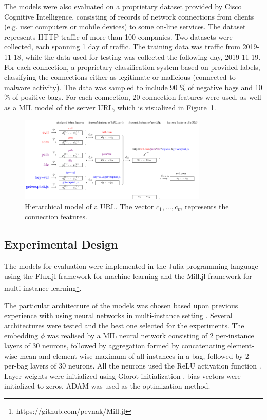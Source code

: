 The models were also evaluated on a proprietary dataset provided by Cisco Cognitive Intelligence, consisting of records of network connections from clients (e.g. user computers or mobile devices) to some on-line services. The dataset represents HTTP traffic of more than 100 companies. Two datasets were collected, each spanning 1 day of traffic. The training data was traffic from 2019-11-18, while the data used for testing was collected the following day, 2019-11-19. For each connection, a proprietary classification system based on \cite{jusko_graph-based_2017} provided labels, classifying the connections either as legitimate or malicious (connected to malware activity). The data was sampled to include 90 \% of negative bags and 10 \% of positive bags. For each connection, 20 connection features were used, as well as a MIL model of the server URL, which is visualized in Figure~\ref{fig:URL-model}.

\begin{figure}
  \centering
  \includegraphics[width=0.8\textwidth]{images/URL-model/URL-model.pdf}
  \caption{Hierarchical model of a URL. The vector \( c_1, \dots, c_m \) represents the connection features.}\label{fig:URL-model}
\end{figure}

\subsection{Experimental Design}

The models for evaluation were implemented in the Julia programming language \cite{bezanson_julia:_2017} using the Flux.jl framework for machine learning \cite{innes_flux:_2018} and the Mill.jl framework for multi-instance learning\footnote{https://github.com/pevnak/Mill.jl}.

The particular architecture of the models was chosen based upon previous experience with using neural networks in multi-instance setting \cite{pevny_nested_2020}. Several architectures were tested and the best one selected for the experiments. The embedding \( \phi \) was realised by a MIL neural network consisting of 2 per-instance layers of 30 neurons, followed by aggregation formed by concatenating element-wise mean and element-wise maximum of all instances in a bag, followed by 2 per-bag layers of 30 neurons. All the neurons used the ReLU activation function \cite{hahnloser_digital_2000}. Layer weights were initialized using Glorot initialization \cite{glorot_understanding_2010}, bias vectors were initialized to zeros. ADAM \cite{kingma_adam:_2017} was used as the optimization method.

